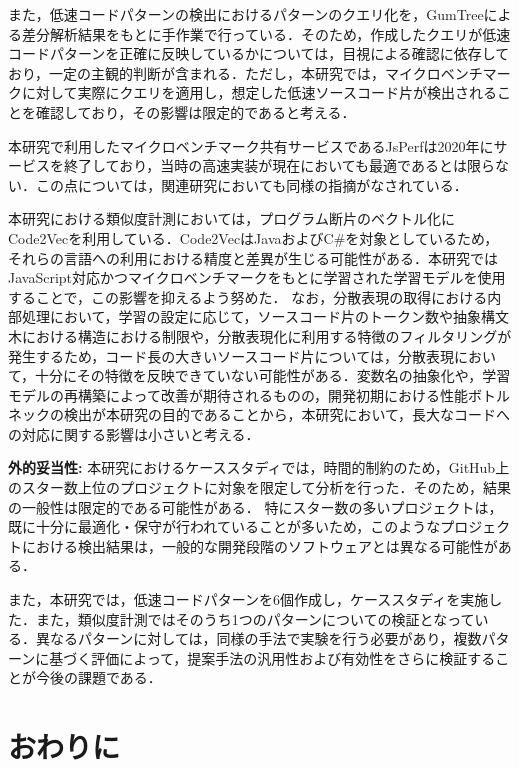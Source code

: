 \documentclass[submit,techrep,noauthor]{ipsj}
\begin{document}
また，低速コードパターンの検出におけるパターンのクエリ化を，GumTreeによる差分解析結果をもとに手作業で行っている．そのため，作成したクエリが低速コードパターンを正確に反映しているかについては，目視による確認に依存しており，一定の主観的判断が含まれる．ただし，本研究では，マイクロベンチマークに対して実際にクエリを適用し，想定した低速ソースコード片が検出されることを確認しており，その影響は限定的であると考える．

本研究で利用したマイクロベンチマーク共有サービスであるJsPerfは2020年にサービスを終了しており，当時の高速実装が現在においても最適であるとは限らない．この点については，関連研究\cite{omori}においても同様の指摘がなされている．

本研究における類似度計測においては，プログラム断片のベクトル化にCode2Vecを利用している．Code2VecはJavaおよびC\#を対象としているため，それらの言語への利用における精度と差異が生じる可能性がある．本研究ではJavaScript対応かつマイクロベンチマークをもとに学習された学習モデル\cite{saiki}を使用することで，この影響を抑えるよう努めた．
なお，分散表現の取得における内部処理において，学習の設定に応じて，ソースコード片のトークン数や抽象構文木における構造における制限や，分散表現化に利用する特徴のフィルタリングが発生するため，コード長の大きいソースコード片については，分散表現において，十分にその特徴を反映できていない可能性がある．変数名の抽象化や，学習モデルの再構築によって改善が期待されるものの，開発初期における性能ボトルネックの検出が本研究の目的であることから，本研究において，長大なコードへの対応に関する影響は小さいと考える．

\noindent\textbf{外的妥当性: }
本研究におけるケーススタディでは，時間的制約のため，GitHub上のスター数上位のプロジェクトに対象を限定して分析を行った．そのため，結果の一般性は限定的である可能性がある．
特にスター数の多いプロジェクトは，既に十分に最適化・保守が行われていることが多いため，このようなプロジェクトにおける検出結果は，一般的な開発段階のソフトウェアとは異なる可能性がある．

また，本研究では，低速コードパターンを6個作成し，ケーススタディを実施した．また，類似度計測ではそのうち1つのパターンについての検証となっている．異なるパターンに対しては，同様の手法で実験を行う必要があり，複数パターンに基づく評価によって，提案手法の汎用性および有効性をさらに検証することが今後の課題である．


\section{おわりに}
\label{sec:summary}
\end{document}
